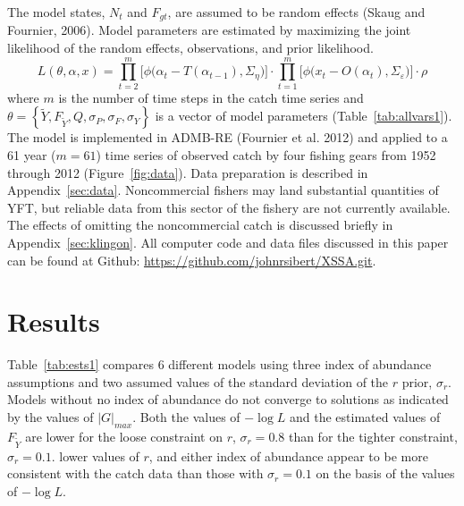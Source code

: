\documentclass[12pt,letterpaper]{article}
\newcommand\MSY{\widetilde{Y}}
\newcommand\Fmsy{F_{\MSY}}
\begin{document}
The model states, $N_t$ and $F_{gt}$, are assumed to be random
effects (Skaug and Fournier, 2006). Model parameters are estimated by
maximizing the joint likelihood of the random
effects, observations, and prior likelihood.
\begin{equation}
\label{eqn:likelihood}
L(\theta,\alpha,x)=
\prod^m_{t=2}\big[\phi\big(\alpha_t-T(\alpha_{t-1}), \Sigma_\eta\big)\big]\cdot
\prod^m_{t=1}\big[\phi\big(x_t-O(\alpha_t),
\Sigma_\varepsilon\big)\big]\cdot\rho
\end{equation}
where $m$ is the number of time steps in the catch time series and
$\theta=\left\{\MSY,\Fmsy,Q,\sigma_P,\sigma_F, \sigma_Y\right\}$ 
is a vector of model parameters (Table~\ref{tab:allvars1}).
The model is implemented in ADMB-RE (Fournier et al. 2012) and
applied to a 61 year ($m=61$) time series of observed
catch by four fishing gears from 1952 through 2012
(Figure~\ref{fig:data}).
Data preparation is described in Appendix~\ref{sec:data}.
Noncommercial fishers may land substantial quantities of YFT, but
reliable data from this sector of the fishery are not currently
available. The effects of omitting the noncommercial catch is
discussed briefly in Appendix~\ref{sec:klingon}.
All computer code and data files discussed in this
paper can be found at Github:
\url{https://github.com/johnrsibert/XSSA.git}.

\section*{Results}
Table~\ref{tab:ests1} compares 6 different models
using three index of abundance assumptions and two 
assumed values of the standard deviation of the $r$ prior, $\sigma_r$. 
Models without no index of abundance do not converge to solutions as
indicated by the values of $|G|_{max}$.
Both the values of $-\log L$ and the estimated values of $\Fmsy$ are
lower for the loose constraint on $r$, $\sigma_r=0.8$ than for the
tighter constraint, $\sigma_r=0.1$.
lower values of $r$, and either
index of abundance appear to be
more consistent with the catch data than those with $\sigma_r=0.1$ on
the basis of the values of $-\log L$. 

\end{document}
